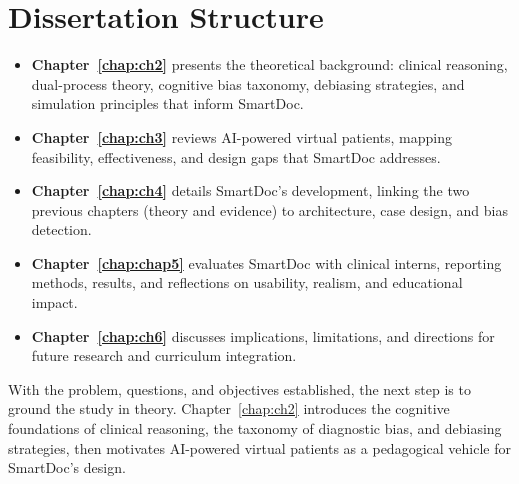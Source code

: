 \section{Dissertation Structure}
\label{sec:structure}

\begin{itemize}
  \item \textbf{Chapter~\ref{chap:ch2}} presents the theoretical background: clinical reasoning, dual-process theory, cognitive bias taxonomy, debiasing strategies, and simulation principles that inform SmartDoc.
  \item \textbf{Chapter~\ref{chap:ch3}} reviews AI-powered virtual patients, mapping feasibility, effectiveness, and design gaps that SmartDoc addresses.
  \item \textbf{Chapter~\ref{chap:ch4}} details SmartDoc's development, linking the two previous chapters (theory and evidence) to architecture, case design, and bias detection.
  \item \textbf{Chapter~\ref{chap:chap5}} evaluates SmartDoc with clinical interns, reporting methods, results, and reflections on usability, realism, and educational impact.
  \item \textbf{Chapter~\ref{chap:ch6}} discusses implications, limitations, and directions for future research and curriculum integration.
\end{itemize}

With the problem, questions, and objectives established, the next step is to ground the study in theory. Chapter~\ref{chap:ch2} introduces the cognitive foundations of clinical reasoning, the taxonomy of diagnostic bias, and debiasing strategies, then motivates AI-powered virtual patients as a pedagogical vehicle for SmartDoc's design.
